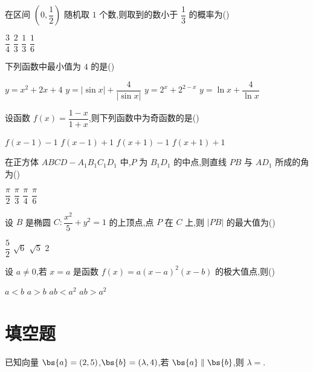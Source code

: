 \begin{problem}
在区间 \(\left(0,\dfrac{1}{2}\right)\) 随机取 \(1\) 个数,则取到的数小于 \(\dfrac{1}{3}\) 的概率为(\quad)

\choices
    {\(\dfrac{3}{4}\)}
    {\(\dfrac{2}{3}\)}
    {\(\dfrac{1}{3}\)}
    {\(\dfrac{1}{6}\)}
\end{problem}

\begin{problem}
下列函数中最小值为 \(4\) 的是(\quad)

\choices
    {\(y=x^2+2x+4\)}
    {\(y=|\sin x|+\dfrac{4}{|\sin x|}\)}
    {\(y=2^x+2^{2-x}\)}
    {\(y=\ln x+\dfrac{4}{\ln x}\)}
\end{problem}

\begin{problem}
设函数 \(f(x)=\dfrac{1-x}{1+x}\),则下列函数中为奇函数的是(\quad)

\choices
    {\(f(x-1)-1\)}
    {\(f(x-1)+1\)}
    {\(f(x+1)-1\)}
    {\(f(x+1)+1\)}
\end{problem}

\begin{problem}
在正方体 \(ABCD-A_1B_1C_1D_1\) 中,\(P\) 为 \(B_1D_1\) 的中点,则直线 \(PB\) 与 \(AD_1\) 所成的角为(\quad)

\choices
    {\(\dfrac{\pi}{2}\)}
    {\(\dfrac{\pi}{3}\)}
    {\(\dfrac{\pi}{4}\)}
    {\(\dfrac{\pi}{6}\)}
\end{problem}

\begin{problem}
设 \(B\) 是椭圆 \(C:\dfrac{x^2}{5}+y^2=1\) 的上顶点,点 \(P\) 在 \(C\) 上,则 \(\lvert PB\rvert\) 的最大值为(\quad)

\choices
    {\(\dfrac{5}{2}\)}
    {\(\sqrt6\)}
    {\(\sqrt5\)}
    {2}
\end{problem}

\begin{problem}
设 \(a\ne0\),若 \(x=a\) 是函数 \(f(x)=a\left(x-a\right)^2\left(x-b\right)\) 的极大值点,则(\quad)

\choices
    {\(a<b\)}
    {\(a>b\)}
    {\(ab<a^2\)}
    {\(ab>a^2\)}
\end{problem}

\section{填空题}

\begin{problem}
已知向量 \(\bs{a}=(2,5)\),\(\bs{b}=(\lambda,4)\),若 \(\bs{a}\parallel\bs{b}\),则 \(\lambda=\)\fillinblank{}.
\end{problem}

